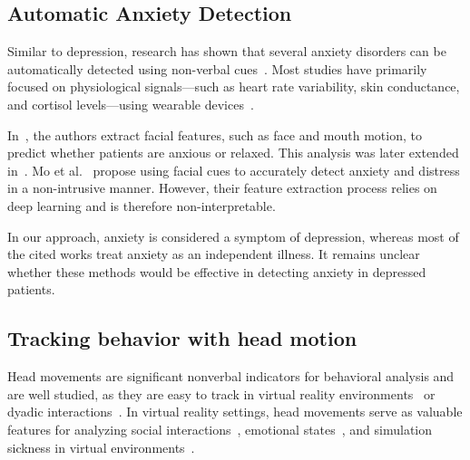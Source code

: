 \subsection{Automatic Anxiety Detection}

Similar to depression, research has shown that several anxiety disorders can be automatically detected using non-verbal cues~\cite{lima2019facial}.
Most studies have primarily focused on physiological signals—such as heart rate variability, skin conductance, and cortisol levels—using wearable devices~\cite{physiological2024,hickey2021smart}.

In~\cite{pediaditis2015extraction}, the authors extract facial features, such as face and mouth motion, to predict whether patients are anxious or relaxed. This analysis was later extended in~\cite{giannakakis2017stress}. Mo et al.~\cite{mo2023sff} propose using facial cues to accurately detect anxiety and distress in a non-intrusive manner. However, their feature extraction process relies on deep learning and is therefore non-interpretable.

In our approach, anxiety is considered a symptom of depression, whereas most of the cited works treat anxiety as an independent illness. It remains unclear whether these methods would be effective in detecting anxiety in depressed patients.

\subsection{Tracking behavior with head motion}

Head movements are significant nonverbal indicators for behavioral analysis and are well studied, as they are easy to track in virtual reality environments~\cite{lindner2021better} or dyadic interactions~\cite{won2014automatic}. In virtual reality settings, head movements serve as valuable features for analyzing social interactions~\cite{herrera2021virtual}, emotional states~\cite{xue2021investigating}, and simulation sickness in virtual environments~\cite{bailenson2006longitudinal}. 

